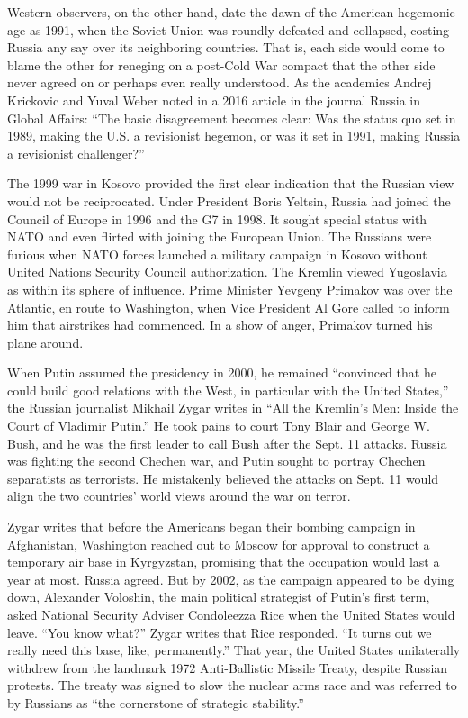 Western observers, on the other hand, date the dawn of the American
hegemonic age as 1991, when the Soviet Union was roundly defeated and
collapsed, costing Russia any say over its neighboring countries. That
is, each side would come to blame the other for reneging on a post-Cold
War compact that the other side never agreed on or perhaps even really
understood. As the academics Andrej Krickovic and Yuval Weber noted in a
2016 article in the journal Russia in Global Affairs: ``The basic
disagreement becomes clear: Was the status quo set in 1989, making the
U.S. a revisionist hegemon, or was it set in 1991, making Russia a
revisionist challenger?''

The 1999 war in Kosovo provided the first clear indication that the
Russian view would not be reciprocated. Under President Boris Yeltsin,
Russia had joined the Council of Europe in 1996 and the G7 in 1998. It
sought special status with NATO and even flirted with joining the
European Union. The Russians were furious when NATO forces launched a
military campaign in Kosovo without United Nations Security Council
authorization. The Kremlin viewed Yugoslavia as within its sphere of
influence. Prime Minister Yevgeny Primakov was over the Atlantic, en
route to Washington, when Vice President Al Gore called to inform him
that airstrikes had commenced. In a show of anger, Primakov turned his
plane around.

When Putin assumed the presidency in 2000, he remained ``convinced that
he could build good relations with the West, in particular with the
United States,'' the Russian journalist Mikhail Zygar writes in ``All
the Kremlin's Men: Inside the Court of Vladimir Putin.'' He took pains
to court Tony Blair and George W. Bush, and he was the first leader to
call Bush after the Sept. 11 attacks. Russia was fighting the second
Chechen war, and Putin sought to portray Chechen separatists as
terrorists. He mistakenly believed the attacks on Sept. 11 would align
the two countries' world views around the war on terror.

Zygar writes that before the Americans began their bombing campaign in
Afghanistan, Washington reached out to Moscow for approval to construct
a temporary air base in Kyrgyzstan, promising that the occupation would
last a year at most. Russia agreed. But by 2002, as the campaign
appeared to be dying down, Alexander Voloshin, the main political
strategist of Putin's first term, asked National Security Adviser
Condoleezza Rice when the United States would leave. ``You know what?''
Zygar writes that Rice responded. ``It turns out we really need this
base, like, permanently.'' That year, the United States unilaterally
withdrew from the landmark 1972 Anti-Ballistic Missile Treaty, despite
Russian protests. The treaty was signed to slow the nuclear arms race
and was referred to by Russians as ``the cornerstone of strategic
stability.''

